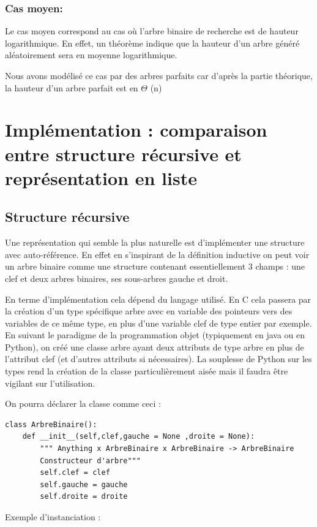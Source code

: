 \documentclass{report}
\begin{document}
\subsubsection{Cas moyen:}
Le cas moyen correspond au cas où l'arbre binaire de recherche est de hauteur logarithmique. En effet, un théorème indique que la hauteur d'un arbre généré aléatoirement sera en moyenne logarithmique.

Nous avons modélisé ce cas par des arbres parfaits car d'après la partie théorique, la hauteur d'un arbre parfait est en $\Theta$ (n)

\section{Implémentation : comparaison entre structure récursive et représentation en liste}
\subsection{Structure récursive}
Une représentation qui semble la plus naturelle est d'implémenter une structure avec auto-référence. En effet en s'inspirant de la définition inductive on peut voir un arbre binaire comme une structure contenant essentiellement 3 champs : une clef et deux arbres binaires, ses sous-arbres gauche et droit. 

En terme d'implémentation cela dépend du langage utilisé. 
En C cela passera par la création d'un type spécifique arbre avec en variable des pointeurs vers des variables de ce même type, en plus d'une variable clef de type entier par exemple. 
En suivant le paradigme de la programmation objet (typiquement en java ou en Python), on créé une classe arbre ayant deux attributs de type arbre en plus de l'attribut clef (et d'autres attributs si nécessaires). La souplesse de Python sur les types rend la création de la classe particulièrement aisée mais il faudra être vigilant sur l'utilisation. 

On pourra déclarer la classe comme ceci :

\begin{lstlisting}
class ArbreBinaire():
    def __init__(self,clef,gauche = None ,droite = None):
        """ Anything x ArbreBinaire x ArbreBinaire -> ArbreBinaire
        Constructeur d'arbre"""
        self.clef = clef
        self.gauche = gauche
        self.droite = droite
\end{lstlisting}

Exemple d'instanciation :
\end{document}
